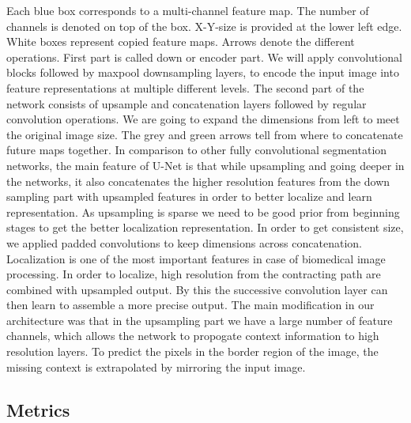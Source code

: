Each blue box corresponds to a multi-channel feature map. The number of channels is denoted on top of the box. X-Y-size is provided at the lower left edge. White boxes represent copied feature maps. Arrows denote the different operations.\newline
First part is called down or encoder part. We will apply convolutional blocks followed by maxpool downsampling layers, to encode the input image into feature representations at multiple different levels. The second part of the network consists of upsample and concatenation layers followed by regular convolution operations. We are going to expand the dimensions from left to meet the original image size. The grey and green arrows tell from where to concatenate future maps together. \newline
In comparison to other fully convolutional segmentation networks, the main feature of U-Net  is that while upsampling and going deeper in the networks, it also concatenates the higher resolution features from the down sampling part with upsampled features in order to better localize and learn representation.\newline
As upsampling is sparse we need to be good prior from beginning stages to get the better localization representation. In order to get consistent size, we applied padded convolutions to keep dimensions across concatenation. Localization is one of the most important features in case of biomedical image processing. In order to localize, high resolution from the contracting path are combined with upsampled output. By this the successive convolution layer can then learn to assemble a more precise output. The main modification in our architecture was that in the upsampling part we have a large number of feature channels, which allows the network to propogate context information to high resolution layers. To predict the pixels in the border region of the image, the missing context is extrapolated by mirroring the input image.

\subsection{Metrics}

